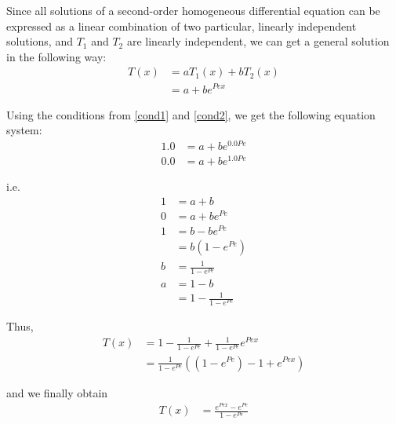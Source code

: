 \documentclass{article}
\begin{document}
Since all solutions of a second-order homogeneous differential equation can be expressed as a linear combination of two particular, linearly independent solutions, and $T_1$ and $T_2$ are linearly independent, we can get a general solution in the following way:
\begin{align}
  T(x) &= a T_1(x) + b T_2(x) \\
       &= a + b e^{Pe x}
\end{align}

Using the conditions from \eqref{cond1} and \eqref{cond2}, we get the following equation system:
\begin{align}
  1.0 &= a + b e^{0.0 Pe} \\
  0.0 &= a + b e^{1.0 Pe}
\end{align}

i.e.
\begin{align}
  1 &= a + b \\
  0 &= a + b e^{Pe} \\
  1 &= b - b e^{Pe} \\
    &= b (1 - e^{Pe}) \\
  b &= \frac{1}{1 - e^{Pe}} \\
  a &= 1 - b \\
    &= 1 - \frac{1}{1 - e^{Pe}}
\end{align}

Thus,
\begin{align}
  T(x) &= 1 - \frac{1}{1 - e^{Pe}} + \frac{1}{1 - e^{Pe}} e^{Pe x} \\
       &= \frac{1}{1 - e^{Pe}}((1 - e^{Pe}) - 1 + e^{Pe x})
\end{align}

and we finally obtain
\begin{align}
  T(x) &= \frac{e^{Pe x} - e^{Pe}}{1 - e^{Pe}}
\end{align}
\end{document}
